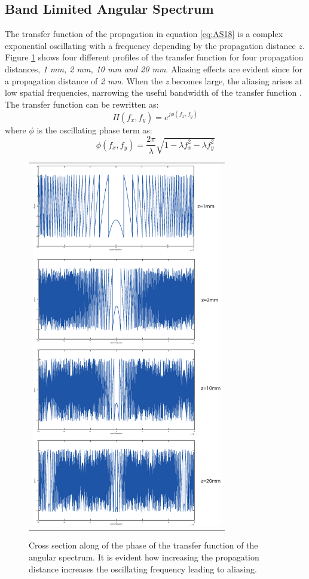  \subsection{Band Limited Angular Spectrum}
 The transfer function of the propagation in equation \ref{eq:AS18} is a complex exponential oscillating with a frequency depending by the propagation distance $z$. Figure \ref{fig:AStransfer} shows four different profiles of the transfer function for four propagation distances, \textit{1 mm, 2 mm, 10 mm and 20 mm}. Aliasing effects are evident since for a propagation distance of \textit{2 mm}. When the \textit{z} becomes large, the aliasing arises at low spatial frequencies, narrowing the useful bandwidth of the transfer function \cite{matsushima2009band}.
 The transfer function can be rewritten as:
 \begin{equation}
 	\label{eq:BL1}
 	H(f_x,f_y) = e^{j \phi(f_x,f_y)}
 \end{equation}
 where $\phi$ is the oscillating phase term as:
 \begin{equation}
 	\label{eq:BL2}
 	\phi(f_x,f_y)=\dfrac{2\pi}{\lambda}\sqrt{1-\lambda f_x^2-\lambda f_y^2}
 \end{equation}
 \newpage
 \begin{figure}[H]
 	\begin{center}
 		\begin{tabular}{c}
 			\includegraphics[height=16cm]{phaseH01.eps}
 		\end{tabular}
 	\end{center}
 	\caption 	{ \label{fig:AStransfer} 
 		Cross section along of the phase of the transfer function of the angular spectrum. It is evident how increasing the propagation distance increases the oscillating frequency leading to aliasing. }
 \end{figure}
